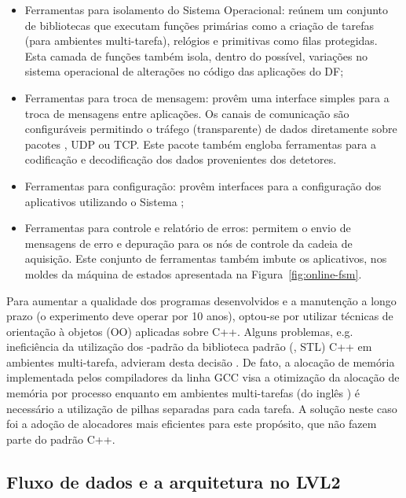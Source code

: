 \begin{itemize}
\item Ferramentas para isolamento do Sistema Operacional: reúnem um
conjunto de bibliotecas que executam funções primárias como a criação de
tarefas (para ambientes multi-tarefa), relógios e primitivas como filas
protegidas. Esta camada de funções também isola, dentro do possível, variações
no sistema operacional de alterações no código das aplicações do DF;

\item Ferramentas para troca de mensagem: provêm uma interface simples para a
troca de mensagens entre aplicações. Os canais de comunicação são
configuráveis permitindo o tráfego (transparente) de dados diretamente sobre
pacotes , UDP ou TCP. Este pacote também engloba ferramentas
para a codificação e decodificação dos dados provenientes dos detetores.

\item Ferramentas para configuração: provêm interfaces para a configuração dos
aplicativos utilizando o Sistema ;

\item Ferramentas para controle e relatório de erros: permitem o envio de
mensagens de erro e depuração para os nós de controle da cadeia de
aquisição. Este conjunto de ferramentas também imbute os aplicativos, nos
moldes da máquina de estados apresentada na Figura~\ref{fig:online-fsm}.
\end{itemize}

Para aumentar a qualidade dos programas desenvolvidos e a manutenção a
longo prazo (o experimento deve operar por 10 anos), optou-se por utilizar
técnicas de orientação à objetos (OO) aplicadas sobre C++. Alguns problemas,
e.g. ineficiência da utilização dos -padrão da biblioteca
padrão (, STL) C++ em ambientes multi-tarefa,
advieram desta decisão \cite{aa:chep-2003}. De fato, a alocação de memória
implementada pelos compiladores da linha GCC \cite{web:gcc, web:gcc-stl} visa
a otimização da alocação de memória por processo enquanto em ambientes
multi-tarefas (do inglês ) é necessário a utilização de
pilhas separadas para cada tarefa. A solução neste caso foi a adoção de
alocadores mais eficientes para este propósito, que não fazem parte do padrão
C++.

\subsection{Fluxo de dados e a arquitetura no LVL2}
\label{sec:lvl2arch}

